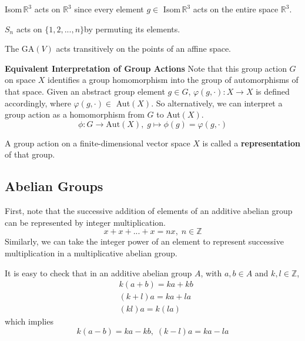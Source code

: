   \begin{example}
    Isom$\,\mathbb{R}^{3}$ acts on $\mathbb{R}^{3}$ since every element $g \in$ Isom$\,\mathbb{R}^{3}$ acts on the entire space $\mathbb{R}^{3}$. 
  \end{example}

  \begin{example}
    $S_n$ acts on $\{1, 2, ..., n\}$by permuting its elements.
  \end{example}

  \begin{example}
    The GA$(V)$ acts transitively on the points of an affine space.
  \end{example}

  \textbf{Equivalent Interpretation of Group Actions}
  Note that this group action $G$ on space $X$ identifies a group homomorphism into the group of automorphisms of that space. Given an abstract group element $g \in G$, $\varphi(g, \cdot): X \longrightarrow X$ is defined accordingly, where $\varphi(g, \cdot) \in $ Aut$(X)$. So alternatively, we can interpret a group action as a homomorphism from $G$ to Aut$(X)$. 
  \begin{equation}
    \phi: G \longrightarrow \text{Aut}(X), \; g \mapsto \phi(g) = \varphi(g,\cdot)
  \end{equation}

  \begin{definition}[Representation]
    A group action on a finite-dimensional vector space $X$ is called a \textbf{representation} of that group. 
  \end{definition}

\subsection{Abelian Groups}

  First, note that the successive addition of elements of an additive abelian group can be represented by integer multiplication. 
  \begin{equation}
    x + x + ... + x = n x, \; n \in \mathbb{Z}
  \end{equation}
  Similarly, we can take the integer power of an element to represent successive multiplication in a multiplicative abelian group. 

  \begin{lemma}
    It is easy to check that in an additive abelian group $A$, with $a, b \in A$ and $k, l \in \mathbb{Z}$, 
    \begin{align}
      & k (a + b) = k a + k b \\
      & (k + l) a = k a + l a \\
      & (k l) a = k (l a)
    \end{align}
    which implies
    \begin{equation}
      k(a - b) = k a - k b, \; (k - l) a = k a - l a
    \end{equation}
  \end{lemma}

